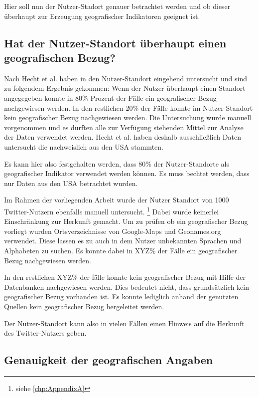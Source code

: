 		Hier soll nun der Nutzer-Stadort genauer betrachtet werden und ob dieser überhaupt zur Erzeugung geografischer Indikatoren geeignet ist.

		\subsection{Hat der Nutzer-Standort überhaupt einen geografischen Bezug?} 
			
			Nach Hecht et al. haben in \cite{Hecht2011} den Nutzer-Standort eingehend untersucht und sind zu folgendem Ergebnis gekommen:
			Wenn der Nutzer überhaupt einen Standort angegegeben konnte in 80\% Prozent der Fälle ein geografischer Bezug nachgewiesen werden.
			In den restlichen 20\% der Fälle konnte im Nutzer-Standort kein geografischer Bezug nachgewiesen werden. 
			Die Untersuchung wurde manuell vorgenommen und es durften alle zur Verfügung stehenden Mittel zur Analyse der Daten verwendet werden. 
			Hecht et al. haben deshalb ausschließlich Daten untersucht die nachweislich aus den USA stammten. 

			Es kann hier also festgehalten werden, dass 80\% der Nutzer-Standorte als geografischer Indikator verwendet werden können.
			Es muss bechtet werden, dass nur Daten aus den USA betrachtet wurden.

			Im Rahmen der vorliegenden Arbeit wurde der Nutzer Standort von 1000 Twitter-Nutzern ebenfalls manuell untersucht. \footnote{siehe \ref{chp:AppendixA} }  
			Dabei wurde keinerlei Einschränkung zur Herkunft gemacht.
			Um zu prüfen ob ein geografischer Bezug vorliegt wurden Ortsverzeichnisse von Google-Maps und Geonames.org verwendet.
			Diese lassen es zu auch in dem Nutzer unbekannten Sprachen und Alphabeten zu suchen.
			Es konnte dabei in XYZ\% der Fälle ein geografischer Bezug nachgewiesen werden. 

			In den restlichen XYZ\% der fälle konnte kein geografischer Bezug mit Hilfe der Datenbanken nachgewiesen werden. 
			Dies bedeutet nicht, dass grundsätzlich kein geografischer Bezug vorhanden ist. 
			Es konnte lediglich anhand der genutzten Quellen kein geografischer Bezug hergeleitet werden.

			Der Nutzer-Standort kann also in vielen Fällen einen Hinweis auf die Herkunft des Twitter-Nutzers geben.

		\subsection{Genauigkeit der geografischen Angaben}

